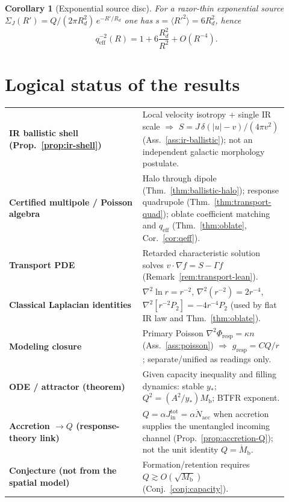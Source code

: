 \documentclass[11pt]{article}
\newtheorem{corollary}[theorem]{Corollary}
\theoremstyle{definition}
\theoremstyle{remark}
\newcommand{\Mb}{M_{\mathrm{b}}}
\newcommand{\qeff}{q_{\mathrm{eff}}}
\begin{document}
\begin{corollary}[Exponential source disc]
\label{cor:exp-disc}
For a razor-thin exponential source $\Sigma_{J}(R')=Q/(2\pi R_{d}^{2})\,e^{-R'/R_{d}}$ one has $s=\langle R'^{2}\rangle=6R_{d}^{2}$, hence
\begin{equation}
  \qeff^{-2}(R)=1+6\frac{R_{d}^{2}}{R^{2}}+O(R^{-4}).
\end{equation}
\end{corollary}

\section{Logical status of the results}
\label{sec:status}
\begin{center}
\small
\begin{tabular}{@{}p{0.44\linewidth}p{0.48\linewidth}@{}}
\toprule
\textbf{IR ballistic shell (Prop.~\ref{prop:ir-shell})} & Local velocity isotropy + single IR scale $\Rightarrow$ $S=J\,\delta(|u|-v)/(4\pi v^{2})$ (Ass.~\ref{ass:ir-ballistic}); not an independent galactic morphology postulate.\\
\textbf{Certified multipole / Poisson algebra} & Halo through dipole (Thm.~\ref{thm:ballistic-halo}); response quadrupole (Thm.~\ref{thm:transport-quad}); oblate coefficient matching and $\qeff$ (Thm.~\ref{thm:oblate}, Cor.~\ref{cor:qeff}).\\
\textbf{Transport PDE} & Retarded characteristic solution solves $v\cdot\nabla f=S-\Gamma f$ (Remark~\ref{rem:transport-lean}).\\
\textbf{Classical Laplacian identities} & $\nabla^{2}\ln r=r^{-2}$, $\nabla^{2}(r^{-2})=2r^{-4}$, $\nabla^{2}[r^{-2}P_{2}]=-4r^{-4}P_{2}$ (used by flat IR law and Thm.~\ref{thm:oblate}).\\
\textbf{Modeling closure} & Primary Poisson $\nabla^{2}\Phi_{\mathrm{resp}}=\kappa n$ (Ass.~\ref{ass:poisson}) $\Rightarrow$ $g_{\mathrm{resp}}=CQ/r$; separate/unified as readings only.\\
\textbf{ODE / attractor (theorem)} & Given capacity inequality and filling dynamics: stable $y_{\ast}$; $Q^{2}=(A^{2}/y_{\ast})\Mb$; BTFR exponent.\\
\textbf{Accretion $\to Q$ (response-theory link)} & $Q=\alpha J_{\mathrm{in}}^{\mathrm{tot}}=\alpha\dot N_{\mathrm{acc}}$ when accretion supplies the unentangled incoming channel (Prop.~\ref{prop:accretion-Q}); not the unit identity $Q=\dot\Mb$.\\
\textbf{Conjecture (not from the spatial model)} & Formation/retention requires $\boxed{Q\gtrsim O(\sqrt{\Mb})}$ (Conj.~\ref{conj:capacity}).\\

\end{tabular}
\end{center}
\end{document}
